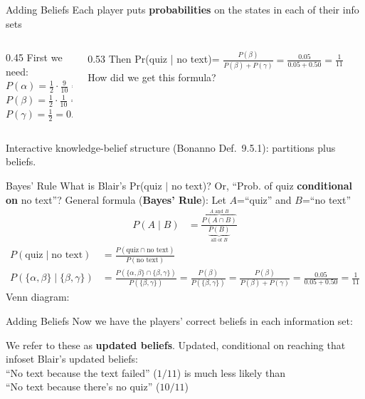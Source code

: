 \begin{frame}{Adding Beliefs}
Each player puts \textbf{probabilities} on the states in each of their info sets
\bsk
\centering
{}
\bsk
\raggedright
\begin{columns}[T]
\begin{column}{0.45\textwidth}
First we need:\\
$P(\alpha)=\tfrac12\cdot\frac{9}{10}=0.45$\\
$P(\beta)=\tfrac12\cdot\frac{1}{10}=0.05$\\
$P(\gamma)=\tfrac12=0.50$
\end{column}
\begin{column}{0.53\textwidth}
Then Pr(quiz | no text)= $\frac{P(\beta)}{P(\beta)+P(\gamma)}=\frac{0.05}{0.05+0.50}=\frac{1}{11}$
\bsk
How did we get this formula?
\end{column}
\end{columns}
\vfill
{\footnotesize Interactive knowledge-belief structure (Bonanno Def.~9.5.1): partitions plus beliefs.}
\vspace{-0.2in}
\end{frame}

\begin{frame}{Bayes' Rule}
What is Blair's Pr(quiz $\mid$ no text)? Or, ``Prob. of quiz \textbf{conditional on} no text''?
\bsk
General formula (\textbf{Bayes' Rule}): Let $A$=``quiz'' and $B$=``no text''
\begin{align*}
    P(A\mid B) &= \frac{\overbrace{P(A\cap B)}^{\text{$A$ and $B$}}}{\underbrace{P(B)}_{\text{all of $B$}}}
\end{align*}
\begin{align*}
    P(\text{quiz}\mid \text{no text}) &= \frac{P(\text{quiz}\cap\text{no text})}{P(\text{no text})}\\
    P(\{\alpha,\beta\}\mid\{\beta,\gamma\}) &=\frac{P(\{\alpha,\beta\} \cap\{\beta,\gamma\})}{P(\{\beta,\gamma\})}=\frac{P(\beta)}{P(\{\beta,\gamma\})}=\frac{P(\beta)}{P(\beta)+P(\gamma)}=\frac{0.05}{0.05+0.50}=\frac{1}{11}
\end{align*}
\bsk
Venn diagram:
\end{frame}

\begin{frame}{Adding Beliefs}
Now we have the players' correct beliefs in each information set:
\bsk
\centering
{}
\bsk
\raggedright
We refer to these as \textbf{updated beliefs}. Updated, conditional on reaching that infoset
\bsk
Blair's updated beliefs:\\
``No text because the text failed'' ($1/11$) is much less likely than\\
``No text because there's no quiz'' ($10/11$)
\vfill
\vspace{-0.2in}
\end{frame}



